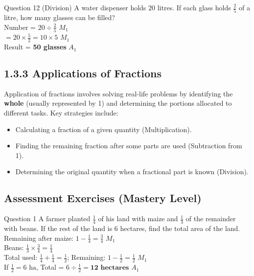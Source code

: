 \documentclass[12pt, a4paper, oneside]{article}
\begin{document}
\begin{solvingbox}{Question 12 (Division)}
A water dispenser holds $20$ litres. If each glass holds $\frac{2}{5}$ of a litre, how many glasses can be filled? \\
Number = $20 \div \frac{2}{5}$ \hfill $M_1$ \\
$= 20 \times \frac{5}{2} = 10 \times 5$ \hfill $M_1$ \\
Result = \textbf{50 glasses} \hfill $A_1$
\end{solvingbox}

\subsection*{1.3.3 Applications of Fractions}

\begin{tcolorbox}[colback=lightgrey, colframe=primaryblue, title=\textbf{Concept Summary}, arc=5pt]
    Application of fractions involves solving real-life problems by identifying the \textbf{whole} (usually represented by 1) and determining the portions allocated to different tasks. Key strategies include:
    \begin{itemize}
        \item Calculating a fraction of a given quantity (Multiplication).
        \item Finding the remaining fraction after some parts are used (Subtraction from 1).
        \item Determining the original quantity when a fractional part is known (Division).
    \end{itemize}
\end{tcolorbox}

\subsection*{Assessment Exercises (Mastery Level)}

\begin{solvingbox}{Question 1}
A farmer planted $\frac{1}{4}$ of his land with maize and $\frac{1}{3}$ of the remainder with beans. If the rest of the land is 6 hectares, find the total area of the land. \\
Remaining after maize: $1 - \frac{1}{4} = \frac{3}{4}$ \hfill $M_1$ \\
Beans: $\frac{1}{3} \times \frac{3}{4} = \frac{1}{4}$ \\
Total used: $\frac{1}{4} + \frac{1}{4} = \frac{1}{2}$; Remaining: $1 - \frac{1}{2} = \frac{1}{2}$ \hfill $M_1$ \\
If $\frac{1}{2} = 6\text{ ha}$, Total = $6 \div \frac{1}{2} = \mathbf{12\text{ hectares}}$ \hfill $A_1$
\end{solvingbox}
\end{document}
